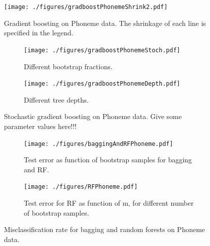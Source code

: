 \begin{figure}[h!]
\begin{center}
    \texttt{[image: ./figures/gradboostPhonemeShrink2.pdf]}
\end{center}
\caption{Gradient boosting on Phoneme data. The shrinkage of each line is specified in the legend.}
\label{fig:gradboostPhonemeShrink2}
\end{figure}

\begin{figure}[h!]
  \centering
  \begin{subfigure}[b]{0.48\textwidth}
    \texttt{[image: ./figures/gradboostPhonemeStoch.pdf]}
    \caption{Different bootstrap fractions.}
    \label{fig:gradboostPhonemeStoch}
  \end{subfigure}%
  \quad
  \begin{subfigure}[b]{0.48\textwidth}
    \texttt{[image: ./figures/gradboostPhonemeDepth.pdf]}
    \caption{Different tree depths.}
    \label{fig:gradboostPhonemeDepth}
  \end{subfigure}
  \vspace{1\baselineskip}
  \caption{Stochastic gradient boosting on Phoneme data. Give some parameter values here!!!}
  \label{fig:StochasticGradBoostPhoneme}
\end{figure}

\begin{figure}[h!]
  \centering
  \begin{subfigure}[b]{0.48\textwidth}
    \texttt{[image: ./figures/baggingAndRFPhoneme.pdf]}
    \caption{Test error as function of bootstrap samples for bagging and RF.}
    \label{fig:baggingAndRFPhoneme}
  \end{subfigure}%
  \quad
  \begin{subfigure}[b]{0.48\textwidth}
    \texttt{[image: ./figures/RFPhoneme.pdf]}
    \caption{Test error for RF as function of m, for different number of bootstrap samples.}
    \label{fig:RFPhoneme}
  \end{subfigure}
  \vspace{1\baselineskip}
  \caption{Misclassification rate for bagging and random forests on Phoneme data.}
  \label{fig:baggAndRFPhoneme}
\end{figure}


\clearpage
